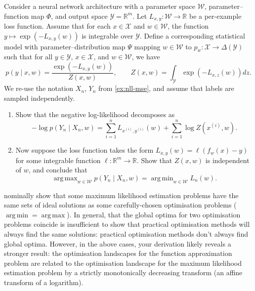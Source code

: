 \documentclass[11pt]{article}
\newcommand{\R}{\mathbb{R}}
\DeclareMathOperator*{\argmin}{arg\,min}
\DeclareMathOperator*{\argmax}{arg\,max}
\newcommand{\X}{\mathcal{X}}
\newcommand{\Y}{\mathcal{Y}}
\newcommand{\W}{\mathcal{W}}
\begin{document}
\begin{exercise}
    \label{ex:nll-energy}
    Consider a neural network architecture with a parameter space $\W$,
    parameter--function map $\Phi$, and output space $\Y = \R^m$.
    Let $L_{x,y} : \W \to \R$ be a per-example loss function. Assume that for
    each $x \in \X$ and $w \in \W$, the function $y \mapsto \exp(-L_{x,y}(w))$
    is integrable over $\Y$. Define a corresponding statistical model with
    parameter--distribution map $\Psi$ mapping $w \in \W$ to
    $p_w : \X \to \Delta(\Y)$ such that for all $y \in \Y$, $x \in \X$, and
    $w \in \W$, we have
    $$
        p(y \mid x, w)
        =
        \frac
            {\exp\!\left(- L_{x,y}(w)\right)}
            {Z(x,w)}
        ,
        \qquad
        Z(x,w)
        =
        \int_{\Y}\exp\!\left(- L_{x,z}(w) \right)dz
        .
    $$
    We re-use the notation $X_n$, $Y_n$ from \cref{ex:nll-mse}, and assume
    that labels are sampled independently.
\begin{enumerate}
    \item
        Show that the negative log-likelihood decomposes as
        $$
            -\log p(Y_n \mid X_n, w)
            =
            \sum_{i=1}^n L_{x^{(i)},y^{(i)}}(w)
            +
            \sum_{i=1}^n \log Z(x^{(i)}, w)
        .$$
    \item
        Now suppose the loss function takes the form
            $L_{x,y}(w) = \ell(f_w(x) - y)$
        for some integrable function $\ell : \R^m \to \R$.
        Show that $Z(x, w)$ is independent of $w$, and conclude that
        $$
            \argmax_{w \in \W} p(Y_n \mid X_n, w)
            =
            \argmin_{w \in \W} L_n(w)
        .$$
\end{enumerate}
\end{exercise}
\begin{remark}
     nominally show that some maximum likelihood estimation
    problems have the same sets of ideal solutions as some carefully-chosen
    optimisation problems ($\argmin = \argmax$).
    In general, that the global optima for two optimisation problems coincide
    is insufficient to show that practical optimisation methods will always
    find the same solutions: practical optimisation methods don't always find
    global optima.
    However, in the above cases, your derivation likely reveals a stronger
    result: the optimisation landscapes for the function approximation
    problem are related to the optimisation landscape for the maximum
    likelihood estimation problem by a strictly monotonically decreasing
    transform (an affine transform of a logarithm).
\end{remark}
        
\end{document}
